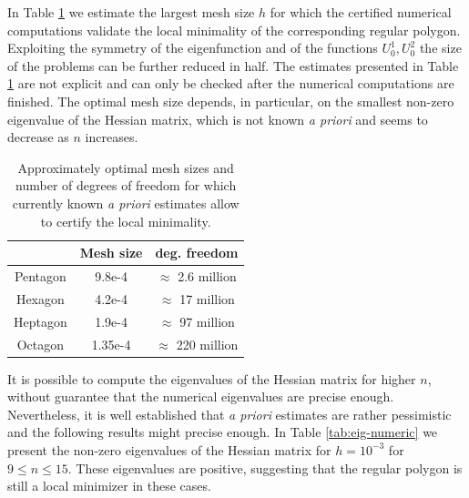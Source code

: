 In Table \ref{table:optimal-size-comp} we estimate the largest mesh size $h$ for which the certified numerical computations validate the local minimality of the corresponding regular polygon. Exploiting the symmetry of the eigenfunction and of the functions $U_0^1, U_0^2$ the size of the problems can be further reduced in half. The estimates presented in Table \ref{table:optimal-size-comp} are not explicit and can only be checked after the numerical computations are finished. The optimal mesh size depends, in particular, on the smallest non-zero eigenvalue of the Hessian matrix, which is not known \emph{a priori} and seems to decrease as $n$ increases.

\begin{table}[htb]
\smaller
\caption{Approximately optimal mesh sizes and number of degrees of freedom for which currently known {\it a priori} estimates allow to certify the local minimality.}
\label{table:optimal-size-comp}
\begin{tabular}{|c|c|c|}
\hline
& Mesh size & deg. freedom \\ \hline
Pentagon & 9.8e-4 & $\approx$ 2.6 million\\ \hline
Hexagon & 4.2e-4 & $\approx$ 17 million\\ \hline
Heptagon & 1.9e-4 & $\approx$ 97 million\\ \hline
Octagon & 1.35e-4 & $\approx$ 220 million\\ \hline
\end{tabular}
\end{table}

It is possible to compute the eigenvalues of the Hessian matrix for higher $n$, without guarantee that the numerical eigenvalues are precise enough. Nevertheless, it is well established that \emph{a priori} estimates are rather pessimistic and the following results might precise enough. In Table \ref{tab:eig-numeric} we present the non-zero eigenvalues of the Hessian matrix for $h=10^{-3}$ for $9\leq n \leq 15$. These eigenvalues are positive, suggesting that the regular polygon is still a local minimizer in these cases.


